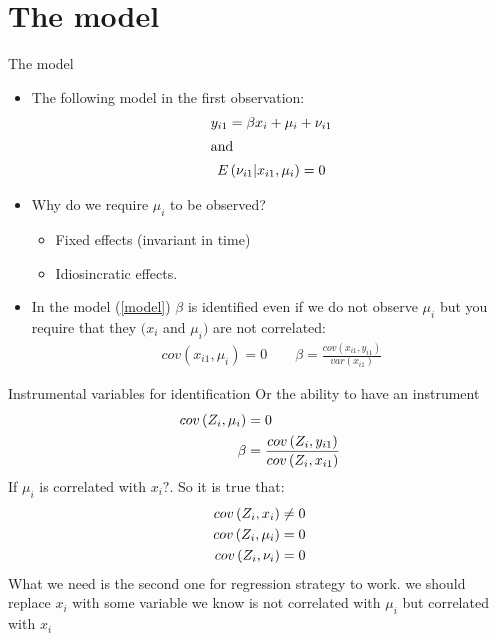 \section{The model}

\begin{frame}{The model}
	\begin{itemize}
		\item The following model in the first observation:
				\begin{gather}
						y_{i1}=\beta x_{i}+\mu_{i}+\nu_{i1}  \label{model} \\
				  	\intertext{and}
						E\left(\nu _{i1}|x_{i1},\mu_{i}\right) = 0 \notag
				\end{gather} \pause
			\vspace{-.5cm}
		\item Why do we require $\mu_{i}$ to be observed? \pause
				\begin{itemize}
					\item Fixed effects (invariant in time) \pause
					\item Idiosincratic effects. \pause
				\end{itemize}
		\item In the model (\ref{model}) $\beta$ is identified even if we do not observe $\mu_{i}$ but you require that they $(x_{i}$ and $\mu_{i})$ are not correlated:
			\vspace{-.5cm}
				\begin{gather}
					cov\left( x_{i1},\mu _{i}\right) =0 \qquad \beta =\frac{cov\left(x_{i1},y_{i1}\right) }{var\left(x_{i1}\right) }  \label{option1}
				\end{gather} \pause
	\end{itemize}
\end{frame}
\begin{frame}{Instrumental variables for identification}
		Or the ability to have an instrument
			\begin{align}
				cov\left(Z_{i},\mu_{i}\right) & = 0 \label{option2} \\
				\beta & = \frac{cov\left(Z_{i},y_{i1}\right) }{cov\left(Z_{i},x_{i1}\right)} \notag
			\end{align}
		If $\mu _{i}$ is correlated with $x_{i}?$. So it is true that:
			\begin{eqnarray}
				cov\left(Z_{i},  x_{i}\right) & \neq 0 \notag \\
				cov\left(Z_{i},\mu_{i}\right) & = 0			  \\
				cov\left(Z_{i},\nu_{i}\right) & = 0	   \notag
			\end{eqnarray}
		What we need is the second one for regression strategy to work. we should replace $x_{i}$ with some variable we know is not correlated with $\mu_{i}$ but correlated with $x_{i}$
\end{frame}
